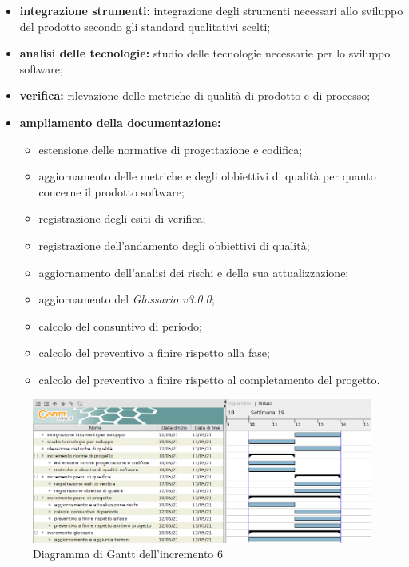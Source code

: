 \begin{itemize}
    \item\textbf{integrazione strumenti:} integrazione degli strumenti necessari allo
          sviluppo del prodotto secondo gli standard qualitativi scelti;
    \item\textbf{analisi delle tecnologie:} studio delle tecnologie necessarie per lo sviluppo software;
    \item \textbf{verifica:} rilevazione delle metriche di qualità di prodotto e di processo;
    \item \textbf{ampliamento della documentazione:}
          \begin{itemize}
              \item estensione delle normative di progettazione e codifica;
              \item aggiornamento delle metriche e degli obbiettivi di qualità per quanto concerne il prodotto software;
              \item registrazione degli esiti di verifica;
              \item registrazione dell'andamento degli obbiettivi di qualità;
              \item aggiornamento dell'analisi dei rischi e della sua attualizzazione;
              \item aggiornamento del \textit{Glossario v3.0.0};
              \item calcolo del consuntivo di periodo;
              \item calcolo del preventivo a finire rispetto alla fase;
              \item calcolo del preventivo a finire rispetto al completamento del progetto.
          \end{itemize}
\end{itemize}

\begin{figure}[!ht]
    \caption{Diagramma di Gantt dell'incremento 6}
    \vspace{5px}
    \includegraphics[scale=0.3]{../../../Images/Diagrammi/Gantt/incremento6.png}
    \centering
\end{figure}

